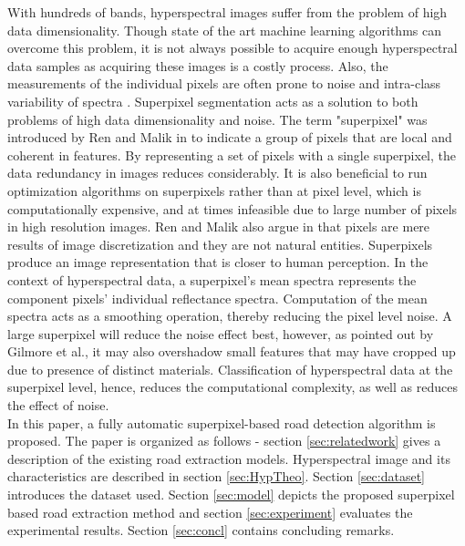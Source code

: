 \documentclass[12pt,twoside]{article}
\theoremstyle{plain}
\theoremstyle{definition}
\theoremstyle{remark}
\newcommand{\forceindent}{\leavevmode{\parindent=2em\indent}}
\begin{document}
\forceindent With hundreds of bands, hyperspectral images suffer from the problem of high data dimensionality. Though state of the art machine learning algorithms can overcome this problem, it is not always possible to acquire enough hyperspectral data samples as acquiring these images is a costly process. Also, the measurements of the individual pixels are often prone to noise and intra-class variability of spectra \cite{thompson2010superpixel}. Superpixel segmentation acts as a solution to both problems of high data dimensionality and noise. The term "superpixel" was introduced by Ren and Malik in \cite{ren2003learning} to indicate a group of pixels that are local and coherent in features. By representing a set of pixels with a single superpixel, the data redundancy in images reduces considerably. It is also beneficial to run optimization algorithms on superpixels rather than at pixel level, which is computationally expensive, and at times infeasible due to large number of pixels in high resolution images. Ren and Malik also argue in \cite{ren2003learning} that pixels are mere results of image discretization and they are not natural entities. Superpixels produce an image representation that is closer to human perception. In the context of hyperspectral data, a superpixel's mean spectra represents the component pixels' individual reflectance spectra. Computation of the mean spectra acts as a smoothing operation, thereby reducing the pixel level noise. A large superpixel will reduce the noise effect best, however, as pointed out by Gilmore et al.\cite{gilmore2011superpixel}, it may also overshadow small features that may have cropped up due to presence of distinct materials. Classification of hyperspectral data at the superpixel level, hence, reduces the computational complexity, as well as reduces the effect of noise.\\
\forceindent In this paper, a fully automatic superpixel-based road detection algorithm is proposed. The paper is organized as follows - section \ref{sec:relatedwork} gives a description of the existing road extraction models. Hyperspectral image and its characteristics are described in section \ref{sec:HypTheo}. Section \ref{sec:dataset} introduces the dataset used. Section \ref{sec:model} depicts the proposed superpixel based road extraction method and section \ref{sec:experiment} evaluates the experimental results. Section \ref{sec:concl} contains concluding remarks.
\end{document}
